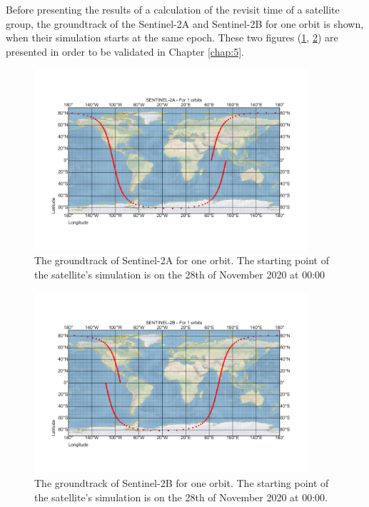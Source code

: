 Before presenting the results of a calculation of the revisit time of a satellite group, the groundtrack of the Sentinel-2A and Sentinel-2B for one orbit is shown, when their simulation starts at the same epoch. These two figures (\ref{groundtrack_Sentinel-2A}, \ref{groundtrack_Sentinel-2B}) are presented in order to be validated in Chapter \ref{chap:5}. 

\begin{figure}
\centering
\includegraphics[width=0.9\textwidth]{Images/groundtrack_Sentinel-2A.png}
\caption{The groundtrack of Sentinel-2A for one orbit. The starting point of the satellite's simulation is on the 28th of November 2020 at 00:00}
\label{groundtrack_Sentinel-2A}
\end{figure}

\begin{figure}
\centering
\includegraphics[width=0.9\textwidth]{Images/groundtrack_Sentinel-2B.png}
\caption{The groundtrack of Sentinel-2B for one orbit. The starting point of the satellite's simulation is on the 28th of November 2020 at 00:00.}
\label{groundtrack_Sentinel-2B}
\end{figure}

